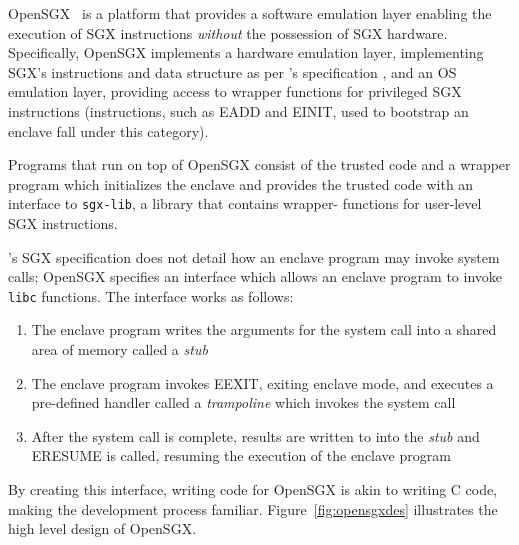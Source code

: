 \documentclass[../main.tex]{subfiles}
\begin{document}
OpenSGX~\cite{opensgx} is a platform that provides a
software emulation layer enabling the execution of SGX instructions
\textit{without} the possession of SGX hardware. Specifically, OpenSGX
implements a hardware emulation layer, implementing SGX's instructions
and data structure as per \Intel's specification \footnotemark, and an
OS emulation layer, providing access to wrapper functions for
privileged SGX instructions (instructions, such as EADD and EINIT,
used to bootstrap an enclave fall under this category)\footnotemark.

Programs that run on top of OpenSGX consist of the trusted code and a
wrapper program which initializes the enclave and provides the trusted
code with an interface to \texttt{sgx-lib}, a library that contains
wrapper- functions for user-level SGX instructions.

\Intel's SGX specification does not detail how an enclave program may
invoke system calls\footnotemark; OpenSGX specifies an interface which
allows an enclave program to invoke \texttt{libc} functions. The
interface works as follows:

\begin{enumerate}
  \item The enclave program writes the arguments for the system call
    into a shared area of memory called a \textit{stub}
  \item The enclave program invokes EEXIT, exiting enclave mode, and
    executes a pre-defined handler called a \textit{trampoline} which
    invokes the system call
  \item After the system call is complete, results are written to into
    the \textit{stub} and ERESUME is called, resuming the execution of the
    enclave program
\end{enumerate} By creating this interface, writing code for OpenSGX
is akin to writing C code, making the development process
familiar. Figure~\ref{fig:opensgxdes} illustrates the high level
design of OpenSGX.
\end{document}
